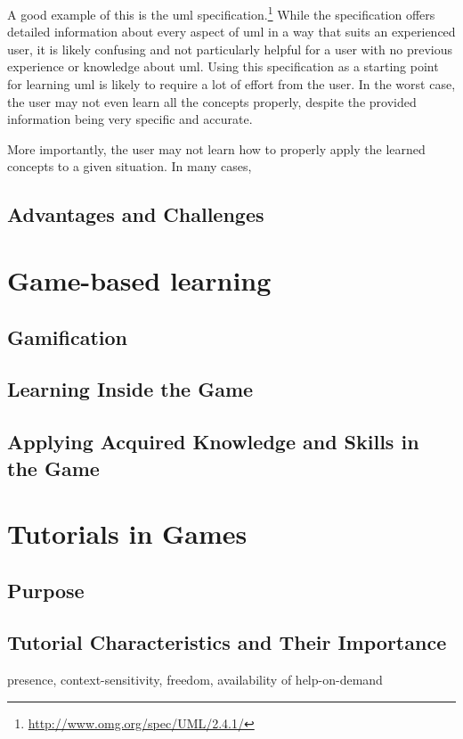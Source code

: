 \noindent
A good example of this is the \gls{uml} specification.\footnote{\url{http://www.omg.org/spec/UML/2.4.1/}} While the specification offers detailed information about every aspect of \gls{uml} in a way that suits an experienced user, it is likely confusing and not particularly helpful for a user with no previous experience or knowledge about \gls{uml}. Using this specification as a starting point for learning \gls{uml} is likely to require a lot of effort from the user. In the worst case, the user may not even learn all the concepts properly, despite the provided information being very specific and accurate.

\noindent
More importantly, the user may not learn how to properly apply the learned concepts to a given situation. In many cases, 


\subsection{Advantages and Challenges}




\section{Game-based learning}
\label{sec:game_based_learning}

\subsection{Gamification}


\subsection{Learning Inside the Game}


\subsection{Applying Acquired Knowledge and Skills in the Game}




\section{Tutorials in Games}
\label{sec:tutorials_in_games}


\subsection{Purpose}

\subsection{Tutorial Characteristics and Their Importance}

presence, context-sensitivity, freedom, availability of help-on-demand




